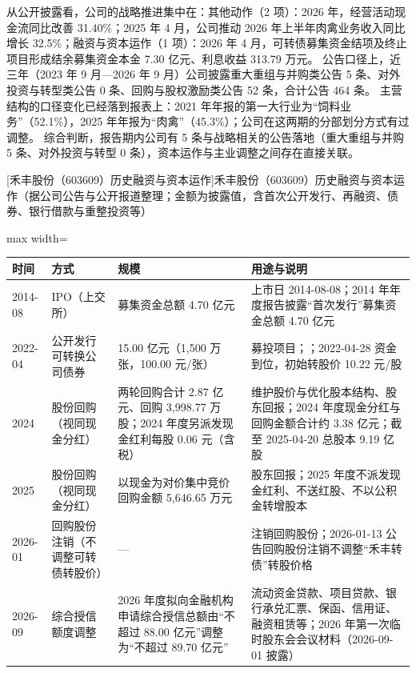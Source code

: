  从公开披露看，公司的战略推进集中在：其他动作（2 项）：2026 年，经营活动现金流同比改善 31.40\%；2025 年 4 月，公司推动 2026 年上半年肉禽业务收入同比增长 32.5\%；融资与资本运作（1 项）：2026 年 4 月，可转债募集资金结项及终止项目形成结余募集资金本金 7.30 亿元、利息收益 313.79 万元。 公告口径上，近三年（2023 年 9 月---2026 年 9 月）公司披露重大重组与并购类公告 5 条、对外投资与转型类公告 0 条、回购与股权激励类公告 52 条，合计公告 464 条。 主营结构的口径变化已经落到报表上：2021 年年报的第一大行业为“饲料业务”（52.1\%），2025 年年报为“肉禽”（45.3\%）；公司在这两期的分部划分方式有过调整。 综合判断，报告期内公司有 5 条与战略相关的公告落地（重大重组与并购 5 条、对外投资与转型 0 条），资本运作与主业调整之间存在直接关联。

\begin{center}\small\setlength{\tabcolsep}{4pt}
[禾丰股份（603609）历史融资与资本运作]{禾丰股份（603609）历史融资与资本运作（据公司公告与公开报道整理；金额为披露值，含首次公开发行、再融资、债券、银行借款与重整投资等）}
\begin{adjustbox}{max width=\textwidth}
\begin{tabular}{@{}p{1.45cm}p{2.55cm}p{4.05cm}p{4.95cm}@{}}
\toprule
时间 & 方式 & 规模 & 用途与说明 \\
\midrule
2014-08 & IPO（上交所） & 募集资金总额 4.70 亿元 & 上市日 2014-08-08；2014 年年度报告披露“首次发行”募集资金总额 4.70 亿元 \\
2022-04 & 公开发行可转换公司债券 & 15.00 亿元（1,\allowbreak{}500 万张，\allowbreak{}100.00 元/\allowbreak{}张） & 募投项目；；2022-04-28 资金到位，\allowbreak{}初始转股价 10.22 元/\allowbreak{}股 \\
2024 & 股份回购（视同现金分红） & 两轮回购合计 2.87 亿元、\allowbreak{}回购 3,\allowbreak{}998.77 万股；2024 年度另派发现金红利每股 0.06 元（含税） & 维护股价与优化股本结构、\allowbreak{}股东回报；2024 年度现金分红与回购金额合计约 3.38 亿元；截至 2025-04-20 总股本 9.19 亿股 \\
2025 & 股份回购（视同现金分红） & 以现金为对价集中竞价回购金额 5,\allowbreak{}646.65 万元 & 股东回报；2025 年度不派发现金红利、\allowbreak{}不送红股、\allowbreak{}不以公积金转增股本 \\
2026-01 & 回购股份注销（不调整可转债转股价） & --- & 注销回购股份；2026-01-13 公告回购股份注销不调整“禾丰转债”转股价格 \\
2026-09 & 综合授信额度调整 & 2026 年度拟向金融机构申请综合授信总额由“不超过 88.00 亿元”调整为“不超过 89.70 亿元” & 流动资金贷款、\allowbreak{}项目贷款、\allowbreak{}银行承兑汇票、\allowbreak{}保函、\allowbreak{}信用证、\allowbreak{}融资租赁等；2026 年第一次临时股东会会议材料（2026-09-01 披露） \\
\bottomrule
\end{tabular}
\end{adjustbox}
\end{center}

